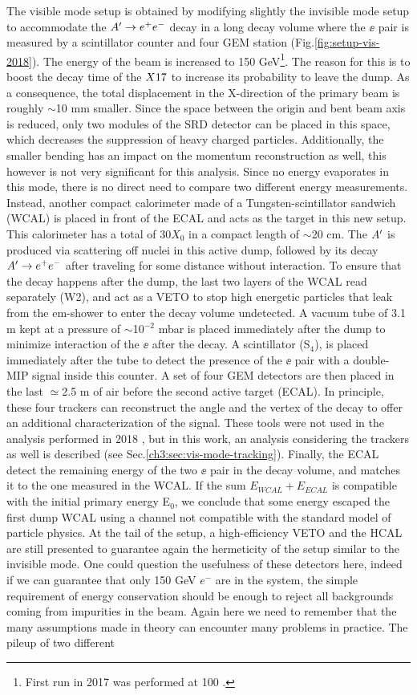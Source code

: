 The visible mode setup is obtained by modifying slightly the invisible mode setup to accommodate the $A' \to e^+e^-$ decay in a long decay volume where the $\ee$ pair is measured by a scintillator counter and four GEM station (Fig.\ref{fig:setup-vis-2018}). The energy of the beam is increased to 150 GeV\footnote{First run in 2017 was performed at 100 \gev.}. The reason for this is to boost the decay time of the $X17$ to increase its probability to leave the dump. As a consequence, the total displacement in the X-direction of the primary beam is roughly $\sim$10 \si{mm} smaller. Since the space between the origin and bent beam axis is reduced, only two modules of the SRD detector can be placed in this space, which decreases the suppression of heavy charged particles. Additionally, the smaller bending has an impact on the momentum reconstruction as well, this however is not very significant for this analysis. Since no energy evaporates in this mode, there is no direct need to compare two different energy measurements. Instead, another compact calorimeter made of a Tungsten-scintillator sandwich (WCAL) is placed in front of the ECAL and acts as the target in this new setup. This calorimeter has a total of 30$X_0$ in a compact length of $\sim$20 \si{cm}. The $A'$ is produced via scattering off nuclei in this active dump, followed by its decay $A' \to e^+e^-$ after traveling for some distance without interaction. To ensure that the decay happens after the dump, the last two layers of the WCAL read separately (W2), and act as a VETO to stop high energetic particles that leak from the em-shower to enter the decay volume undetected. A vacuum tube of 3.1 \si{m} kept at a pressure of $\sim$10$^{-2}$ \si{mbar} is placed immediately after the dump to minimize interaction of the $\ee$ after the decay. A scintillator (S$_4$), is placed immediately after the tube to detect the presence of the $\ee$ pair with a double-MIP signal inside this counter. A set of four GEM detectors are then placed in the last $\simeq$2.5 \si{m} of air before the second active target (ECAL). In principle, these four trackers can reconstruct the angle and the vertex of the decay to offer an additional characterization of the signal. These tools were not used in the analysis performed in 2018 \cite{Banerjee:2019hmi}, but in this work, an analysis considering the trackers as well is described (see Sec.\ref{ch3:sec:vis-mode-tracking}). Finally, the ECAL detect the remaining energy of the two $\ee$ pair in the decay volume, and matches it to the one measured in the WCAL. If the sum $E_{WCAL}+E_{ECAL}$ is compatible with the initial primary energy E$_0$, we conclude that some energy escaped the first dump WCAL using a channel not compatible with the standard model of particle physics. At the tail of the setup, a high-efficiency VETO and the HCAL are still presented to guarantee again the hermeticity of the setup similar to the invisible mode. One could question the usefulness of these detectors here, indeed if we can guarantee that only 150 GeV $e^-$ are in the system, the simple requirement of energy conservation should be enough to reject all backgrounds coming from impurities in the beam. Again here we need to remember that the many assumptions made in theory can encounter many problems in practice. The pileup of two different 